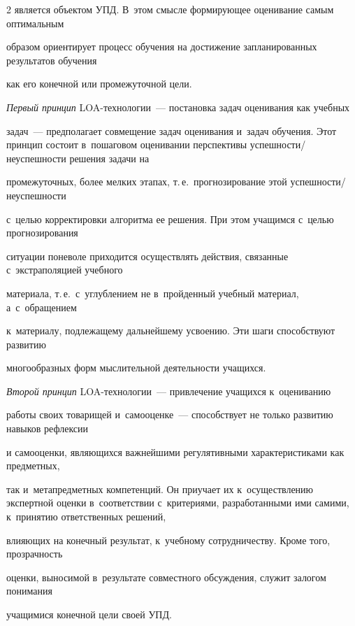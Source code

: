 \begin{multicols}{2}
является объектом УПД. В~этом смысле формирующее оценивание самым оптимальным


образом ориентирует процесс обучения на достижение запланированных результатов обучения


как его конечной или промежуточной цели.





  \textit{Первый принцип} LOA-тех\-но\-ло\-гии~--- постановка задач оценивания как учебных


задач~--- предполагает совмещение задач оценивания и~задач обучения. Этот принцип состоит в~пошаговом оценивании перспективы успешности/неуспешности решения задачи на


промежуточных, более мелких этапах, т.\,е.\ прогнозирование этой успешности/неуспешности


с~целью корректировки алгоритма ее решения. При этом учащимся с~целью прогнозирования


ситуации поневоле приходится осуществлять действия, связанные с~экстраполяцией учебного


материала, т.\,е.\ с~углублением не в~пройденный учебный материал, а~с~обращением


к~материалу, подлежащему дальнейшему усвоению. Эти шаги способствуют развитию


многообразных форм мыслительной деятельности учащихся.








  \textit{Второй принцип} LOA-тех\-но\-ло\-гии~--- при\-вле\-чение учащихся к~оцениванию


работы своих товарищей и~самооценке~--- способствует не только \mbox{развитию} навыков рефлексии


и самооценки, являющихся важнейшими регулятивными характеристиками как предметных,


так и~метапредметных компетенций. Он приучает их к~осуществлению экспертной оценки в~соответствии с~критериями, разработанными ими самими, к~принятию ответственных решений,


влияющих на конечный результат, к~учебному сотрудничеству. Кроме того, прозрачность


оценки, выносимой в~результате совместного обсуждения, служит залогом понимания


учащимися конечной цели своей УПД.






\end{multicols}
